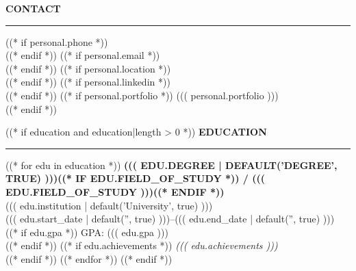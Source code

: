 \documentclass[11pt,a4paper]{article}
\newcommand{\leftsectiontitle}[1]{%
  {\fontsize{10}{12}\selectfont\bfseries\color{navy}\MakeUppercase{#1}}\\[-2pt]
  \rule{0.28\textwidth}{0.4pt}\vspace{4pt}
}
\begin{document}
\noindent
{}

\vspace{60pt}

\noindent
\begin{minipage}[t]{0.30\textwidth}
\hspace{8mm}
\begin{minipage}[t]{0.85\textwidth}
\vspace{0pt}

\leftsectiontitle{Contact}

((* if personal.phone *))
\\[6pt]
((* endif *))
((* if personal.email *))
\\[6pt]
((* endif *))
((* if personal.location *))
\\[6pt]
((* endif *))
((* if personal.linkedin *))
\\ 
((* endif *))
((* if personal.portfolio *))
{\small\faGlobe\hspace{6pt}((( personal.portfolio )))}\\
((* endif *))

\vspace{9pt}

((* if education and education|length > 0 *))
\leftsectiontitle{Education}
((* for edu in education *))
{\small\bfseries\MakeUppercase{((( edu.degree | default('Degree', true) )))((* if edu.field_of_study *)) / ((( edu.field_of_study )))((* endif *))}}\\
{\small ((( edu.institution | default('University', true) )))}\\
{\small\color{muted} ((( edu.start_date | default('', true) )))--((( edu.end_date | default('', true) )))}\\[8pt]
((* if edu.gpa *))
{\small GPA: ((( edu.gpa )))}\\
((* endif *))
((* if edu.achievements *))
{\small\textit{((( edu.achievements )))}}\\
((* endif *))
((* endfor *))
\vspace{6pt}
((* endif *))


\end{minipage}
\end{minipage}
\end{document}
